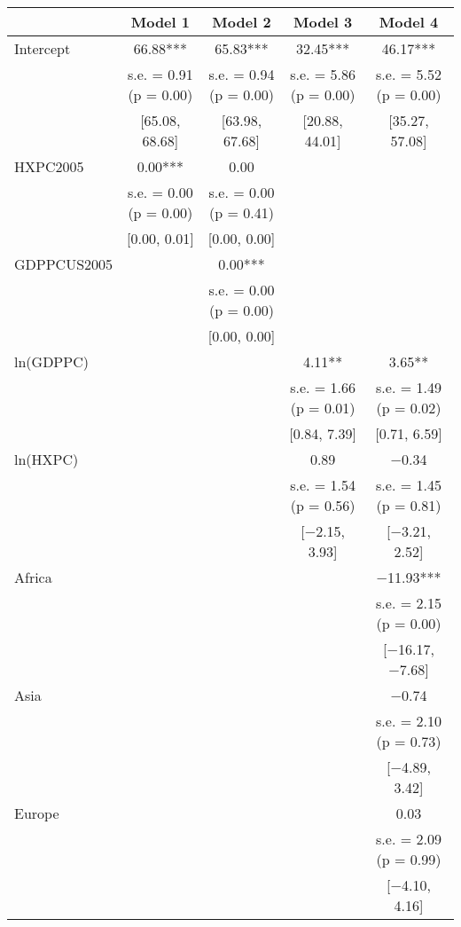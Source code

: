 \documentclass[
]{article}
\begin{document}
\begin{table}
\centering
\begin{tabular}[t]{lcccc}
\toprule
  & Model 1 & Model 2 & Model 3 & Model 4\\
\midrule
Intercept & \num{66.88}*** & \num{65.83}*** & \num{32.45}*** & \num{46.17}***\\
 & s.e. = \num{0.91} (p = \num{0.00}) & s.e. = \num{0.94} (p = \num{0.00}) & s.e. = \num{5.86} (p = \num{0.00}) & s.e. = \num{5.52} (p = \num{0.00})\\
 & {}[\num{65.08}, \num{68.68}] & {}[\num{63.98}, \num{67.68}] & {}[\num{20.88}, \num{44.01}] & {}[\num{35.27}, \num{57.08}]\\
HXPC2005 & \num{0.00}*** & \num{0.00} &  & \\
 & s.e. = \num{0.00} (p = \num{0.00}) & s.e. = \num{0.00} (p = \num{0.41}) &  & \\
 & {}[\num{0.00}, \num{0.01}] & {}[\num{0.00}, \num{0.00}] &  & \\
GDPPCUS2005 &  & \num{0.00}*** &  & \\
 &  & s.e. = \num{0.00} (p = \num{0.00}) &  & \\
 &  & {}[\num{0.00}, \num{0.00}] &  & \\
ln(GDPPC) &  &  & \num{4.11}** & \num{3.65}**\\
 &  &  & s.e. = \num{1.66} (p = \num{0.01}) & s.e. = \num{1.49} (p = \num{0.02})\\
 &  &  & {}[\num{0.84}, \num{7.39}] & {}[\num{0.71}, \num{6.59}]\\
ln(HXPC) &  &  & \num{0.89} & \num{-0.34}\\
 &  &  & s.e. = \num{1.54} (p = \num{0.56}) & s.e. = \num{1.45} (p = \num{0.81})\\
 &  &  & {}[\num{-2.15}, \num{3.93}] & {}[\num{-3.21}, \num{2.52}]\\
Africa &  &  &  & \num{-11.93}***\\
 &  &  &  & s.e. = \num{2.15} (p = \num{0.00})\\
 &  &  &  & {}[\num{-16.17}, \num{-7.68}]\\
Asia &  &  &  & \num{-0.74}\\
 &  &  &  & s.e. = \num{2.10} (p = \num{0.73})\\
 &  &  &  & {}[\num{-4.89}, \num{3.42}]\\
Europe &  &  &  & \num{0.03}\\
 &  &  &  & s.e. = \num{2.09} (p = \num{0.99})\\
 &  &  &  & {}[\num{-4.10}, \num{4.16}]\\

\end{tabular}
\end{table}
\end{document}
